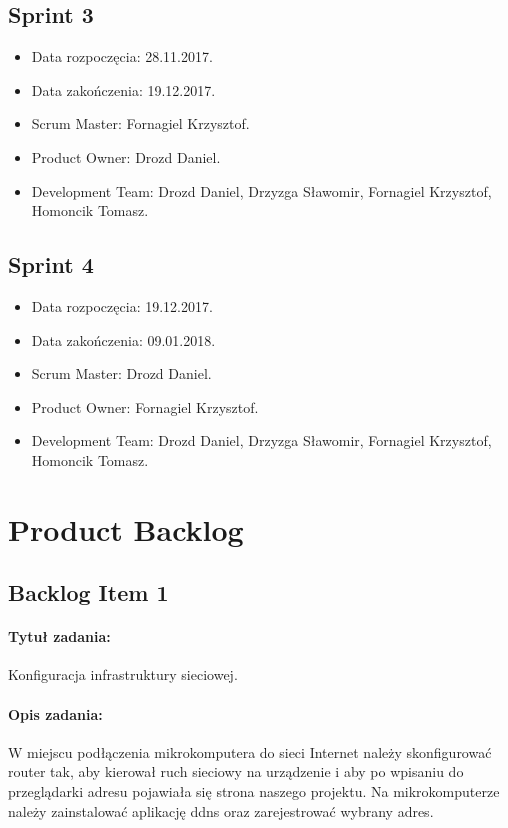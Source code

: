 	\subsection{Sprint 3}
	\begin{itemize}
		\item Data rozpoczęcia: 28.11.2017.
		\item Data zakończenia: 19.12.2017.
		\item Scrum Master: Fornagiel Krzysztof.
		\item Product Owner: Drozd Daniel.
		\item Development Team: Drozd Daniel, Drzyzga Sławomir, Fornagiel Krzysztof, Homoncik Tomasz.
	\end{itemize}
	
	\subsection{Sprint 4}
	\begin{itemize}
		\item Data rozpoczęcia: 19.12.2017.
		\item Data zakończenia: 09.01.2018.
		\item Scrum Master: Drozd Daniel.
		\item Product Owner: Fornagiel Krzysztof.
		\item Development Team: Drozd Daniel, Drzyzga Sławomir, Fornagiel Krzysztof, Homoncik Tomasz.
	\end{itemize}
	
\section{Product Backlog}
	\subsection{Backlog Item 1}
	\paragraph{Tytuł zadania:}
	Konfiguracja infrastruktury sieciowej.
	
	\paragraph{Opis zadania:}
	W miejscu podłączenia mikrokomputera do sieci Internet należy skonfigurować router tak, aby kierował ruch sieciowy na urządzenie i aby po wpisaniu do przeglądarki adresu pojawiała się strona naszego projektu. Na mikrokomputerze należy zainstalować aplikację ddns oraz zarejestrować wybrany adres.
	
